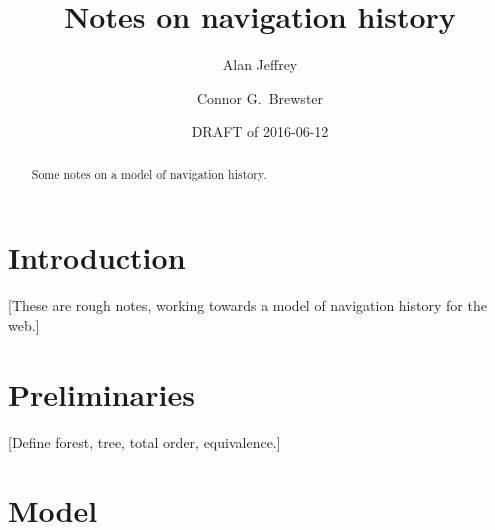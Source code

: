 \documentclass{article}
\title{Notes on navigation history}
\author{%
  Alan Jeffrey
  \and
  Connor G.~Brewster
}
\date{DRAFT of 2016-06-12}
\begin{document}
\maketitle

\begin{abstract}
  Some notes on a model of navigation history.
\end{abstract}

\section{Introduction}

[These are rough notes, working towards a model of navigation history for the web.]

\section{Preliminaries}

[Define forest, tree, total order, equivalence.]

\section{Model}
\end{document}
